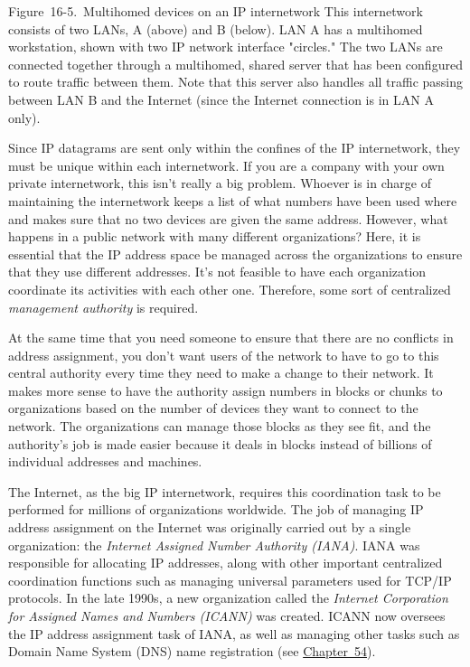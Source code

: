 \documentclass[b5paper,11pt]{memoir}
\begin{document}
Figure~16-5.~Multihomed devices on an IP internetwork This internetwork
consists of two LANs, A (above) and B (below). LAN A has a multihomed
workstation, shown with two IP network interface "circles." The two LANs
are connected together through a multihomed, shared server that has been
configured to route traffic between them. Note that this server also
handles all traffic passing between LAN B and the Internet (since the
Internet connection is in LAN A only).

Since IP datagrams are sent only within the confines of the IP
internetwork, they must be unique within each internetwork. If you are a
company with your own private internetwork, this isn't really a big
problem. Whoever is in charge of maintaining the internetwork keeps a
list of what numbers have been used where and makes sure that no two
\protect\hypertarget{ch16s06.htmlux5cux23idx-CHP-16-0675}{}{}devices are
given the same address. However, what happens in a public network with
many different organizations? Here, it is essential that the IP address
space be managed across the organizations to ensure that they use
different addresses. It's not feasible to have each organization
coordinate its activities with each other one. Therefore, some sort of
centralized {\emph{management authority}} is required.

At the same time that you need someone to ensure that there are no
conflicts in address assignment, you don't want users of the network to
have to go to this central authority every time they need to make a
change to their network. It makes more sense to have the authority
assign numbers in blocks or chunks to organizations based on the number
of devices they want to connect to the network. The organizations can
manage those blocks as they see fit, and the authority's job is made
easier because it deals in blocks instead of billions of individual
addresses and machines.

The Internet, as the big IP internetwork, requires this coordination
task to be performed for millions of organizations worldwide. The job of
managing IP address assignment on the Internet was originally carried
out by a single organization: the {\emph{Internet Assigned Number
Authority (IANA)}}. IANA was responsible for allocating IP addresses,
along with other important centralized coordination functions such as
managing universal parameters used for TCP/IP protocols. In the late
1990s, a new organization called the {\emph{Internet Corporation for
Assigned Names and Numbers (ICANN)}} was created. ICANN now oversees the
IP address assignment task of IANA, as well as managing other tasks such
as Domain Name System (DNS) name registration (see
\protect\hyperlink{ch54.html}{Chapter~54}).
\end{document}
